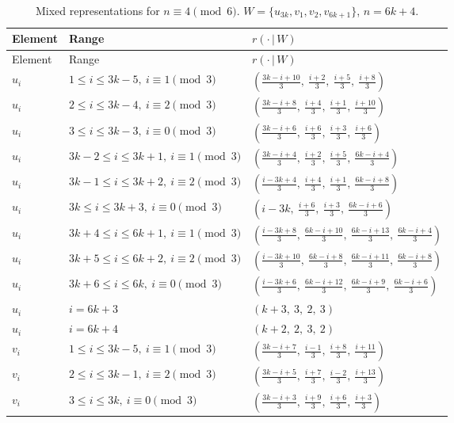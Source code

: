 \clearpage
\begin{longtable}{lll}
\caption{Mixed representations for $n\equiv 4 \pmod 6$. $W=\{u_{3k}, v_{1}, v_{2}, v_{6k+1}\}$, $n=6k+4$.}\label{tab:W4}\\
\hline Element & Range & $r(\cdot\,|\,W)$ \\ \hline
\endfirsthead
\hline Element & Range & $r(\cdot\,|\,W)$ \\ \hline
\endhead
$u_i$ & $1 \le i \le 3k-5,\ i \equiv 1 \pmod{3}$ & $(\frac{3k-i+10}{3},\ \frac{i+2}{3},\ \frac{i+5}{3},\ \frac{i+8}{3})$ \\
$u_i$ & $2 \le i \le 3k-4,\ i \equiv 2 \pmod{3}$ & $(\frac{3k-i+8}{3},\ \frac{i+4}{3},\ \frac{i+1}{3},\ \frac{i+10}{3})$ \\
$u_i$ & $3 \le i \le 3k-3,\ i \equiv 0 \pmod{3}$ & $(\frac{3k-i+6}{3},\ \frac{i+6}{3},\ \frac{i+3}{3},\ \frac{i+6}{3})$ \\
$u_i$ & $3k-2 \le i \le 3k+1,\ i \equiv 1 \pmod{3}$ & $(\frac{3k-i+4}{3},\ \frac{i+2}{3},\ \frac{i+5}{3},\ \frac{6k-i+4}{3})$ \\
$u_i$ & $3k-1 \le i \le 3k+2,\ i \equiv 2 \pmod{3}$ & $(\frac{i-3k+4}{3},\ \frac{i+4}{3},\ \frac{i+1}{3},\ \frac{6k-i+8}{3})$ \\
$u_i$ & $3k \le i \le 3k+3,\ i \equiv 0 \pmod{3}$ & $(i-3k,\ \frac{i+6}{3},\ \frac{i+3}{3},\ \frac{6k-i+6}{3})$ \\
$u_i$ & $3k+4 \le i \le 6k+1,\ i \equiv 1 \pmod{3}$ & $(\frac{i-3k+8}{3},\ \frac{6k-i+10}{3},\ \frac{6k-i+13}{3},\ \frac{6k-i+4}{3})$ \\
$u_i$ & $3k+5 \le i \le 6k+2,\ i \equiv 2 \pmod{3}$ & $(\frac{i-3k+10}{3},\ \frac{6k-i+8}{3},\ \frac{6k-i+11}{3},\ \frac{6k-i+8}{3})$ \\
$u_i$ & $3k+6 \le i \le 6k,\ i \equiv 0 \pmod{3}$ & $(\frac{i-3k+6}{3},\ \frac{6k-i+12}{3},\ \frac{6k-i+9}{3},\ \frac{6k-i+6}{3})$ \\
$u_i$ & $i = 6k+3$ & $(k+3,\ 3,\ 2,\ 3)$ \\
$u_i$ & $i = 6k+4$ & $(k+2,\ 2,\ 3,\ 2)$ \\
$v_i$ & $1 \le i \le 3k-5,\ i \equiv 1 \pmod{3}$ & $(\frac{3k-i+7}{3},\ \frac{i-1}{3},\ \frac{i+8}{3},\ \frac{i+11}{3})$ \\
$v_i$ & $2 \le i \le 3k-1,\ i \equiv 2 \pmod{3}$ & $(\frac{3k-i+5}{3},\ \frac{i+7}{3},\ \frac{i-2}{3},\ \frac{i+13}{3})$ \\
$v_i$ & $3 \le i \le 3k,\ i \equiv 0 \pmod{3}$ & $(\frac{3k-i+3}{3},\ \frac{i+9}{3},\ \frac{i+6}{3},\ \frac{i+3}{3})$ \\

\end{longtable}
